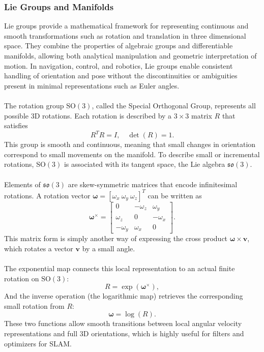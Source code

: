\subsubsection{Lie Groups and Manifolds}
Lie groups provide a mathematical framework for representing continuous and smooth transformations such as rotation and translation in three dimensional space. They combine the properties of algebraic groups and differentiable manifolds, allowing both analytical manipulation and geometric interpretation of motion. In navigation, control, and robotics, Lie groups enable consistent handling of orientation and pose without the discontinuities or ambiguities present in minimal representations such as Euler angles.  
\\ \\
The rotation group $\mathrm{SO}(3)$, called the Special Orthogonal Group, represents all possible 3D rotations. Each rotation is described by a $3\times3$ matrix $R$ that satisfies
$$
    R^T R = I, \quad \det(R) = 1.
$$
This group is smooth and continuous, meaning that small changes in orientation correspond to small movements on the manifold. To describe small or incremental rotations, $\mathrm{SO}(3)$ is associated with its tangent space, the Lie algebra $\mathfrak{so}(3)$.  
\\ \\
Elements of $\mathfrak{so}(3)$ are skew-symmetric matrices that encode infinitesimal rotations. A rotation vector $\boldsymbol{\omega} = [\omega_x~\omega_y~\omega_z]^T$ can be written as
$$
    \boldsymbol{\omega}^\times =
    \begin{bmatrix}
        0 & -\omega_z & \omega_y \\
        \omega_z & 0 & -\omega_x \\
        -\omega_y & \omega_x & 0
    \end{bmatrix}.
$$
This matrix form is simply another way of expressing the cross product $\boldsymbol{\omega} \times \mathbf{v}$, which rotates a vector $\mathbf{v}$ by a small angle.  
\\ \\
The exponential map connects this local representation to an actual finite rotation on $\mathrm{SO}(3)$:
$$
    R = \exp(\boldsymbol{\omega}^\times),
$$
And the inverse operation (the logarithmic map) retrieves the corresponding small rotation from $R$:
$$
    \boldsymbol{\omega} = \log(R).
$$
These two functions allow smooth transitions between local angular velocity representations and full 3D orientations, which is highly useful for filters and optimizers for SLAM.  

